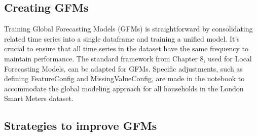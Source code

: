 \documentclass{article}
\begin{document}
\subsection{Creating GFMs}
Training Global Forecasting Models (GFMs) is straightforward by consolidating related time series into a single dataframe and training a unified model. It's crucial to ensure that all time series in the dataset have the same frequency to maintain performance. The standard framework from Chapter 8, used for Local Forecasting Models, can be adapted for GFMs. Specific adjustments, such as defining FeatureConfig and MissingValueConfig, are made in the notebook to accommodate the global modeling approach for all households in the London Smart Meters dataset.



\subsection{Strategies to improve GFMs}
\end{document}
